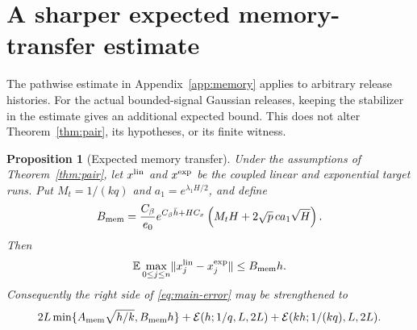 \documentclass[a4paper,11pt]{article}
\newtheorem{proposition}[theorem]{Proposition}
\theoremstyle{remark}
\newcommand{\E}{\mathbb E}
\newcommand{\norm}[1]{\lVert#1\rVert}
\begin{document}
\section{A sharper expected memory-transfer estimate}\label{app:expected-memory}

The pathwise estimate in Appendix~\ref{app:memory} applies to arbitrary
release histories. For the actual bounded-signal Gaussian releases, keeping
the stabilizer in the estimate gives an additional expected bound. This
does not alter Theorem~\ref{thm:pair}, its hypotheses, or its finite witness.

\begin{proposition}[Expected memory transfer]\label{prop:expected-memory}
Under the assumptions of Theorem~\ref{thm:pair}, let $x^{\rm lin}$ and
$x^{\rm exp}$ be the coupled linear and exponential target runs. Put
$M_t=1/(kq)$ and $a_1=e^{\lambda_1H/2}$, and define
\begin{equation}\label{eq:expected-memory-constant}
 B_{\rm mem}=\frac{C_\beta}{e_0}
       e^{C_\beta\bar h+HC_x}
       \left(M_tH+2\sqrt p\,c a_1\sqrt H\right).
\end{equation}
Then
\begin{equation}\label{eq:expected-memory}
 \E\max_{0\le j\le n}\norm{x_j^{\rm lin}-x_j^{\rm exp}}
 \le B_{\rm mem}h.
\end{equation}
Consequently the right side of \eqref{eq:main-error} may be strengthened to
\begin{equation}\label{eq:sharper-pair}
 2L\min\{A_{\rm mem}\sqrt{h/k},B_{\rm mem}h\}
 +\mathcal E(h;1/q,L,2L)+\mathcal E(kh;1/(kq),L,2L).
\end{equation}
\end{proposition}
\end{document}
